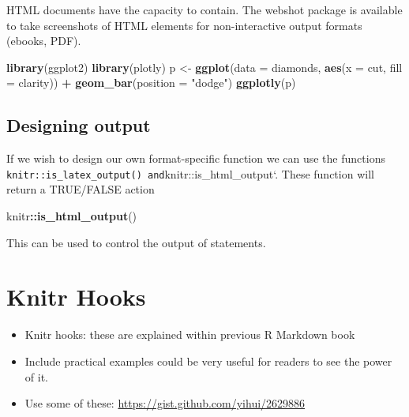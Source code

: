\documentclass[]{book}
\newenvironment{Shaded}{\begin{snugshade}}{\end{snugshade}}
\newcommand{\DataTypeTok}[1]{\textcolor[rgb]{0.13,0.29,0.53}{#1}}
\newcommand{\KeywordTok}[1]{\textcolor[rgb]{0.13,0.29,0.53}{\textbf{#1}}}
\newcommand{\NormalTok}[1]{#1}
\newcommand{\OperatorTok}[1]{\textcolor[rgb]{0.81,0.36,0.00}{\textbf{#1}}}
\newcommand{\StringTok}[1]{\textcolor[rgb]{0.31,0.60,0.02}{#1}}
\providecommand{\tightlist}{%
  \setlength{\itemsep}{0pt}\setlength{\parskip}{0pt}}
\theoremstyle{definition}
\theoremstyle{definition}
\theoremstyle{definition}
\theoremstyle{remark}
\begin{document}
HTML documents have the capacity to contain. The webshot package is
available to take screenshots of HTML elements for non-interactive
output formats (ebooks, PDF).

\begin{Shaded}
\begin{Highlighting}[]
\KeywordTok{library}\NormalTok{(ggplot2)}
\KeywordTok{library}\NormalTok{(plotly)}
\NormalTok{p <-}\StringTok{ }\KeywordTok{ggplot}\NormalTok{(}\DataTypeTok{data =}\NormalTok{ diamonds, }\KeywordTok{aes}\NormalTok{(}\DataTypeTok{x =}\NormalTok{ cut, }\DataTypeTok{fill =}\NormalTok{ clarity)) }\OperatorTok{+}
\StringTok{            }\KeywordTok{geom_bar}\NormalTok{(}\DataTypeTok{position =} \StringTok{"dodge"}\NormalTok{)}
\KeywordTok{ggplotly}\NormalTok{(p)}
\end{Highlighting}
\end{Shaded}

\hypertarget{designing-output}{%
\section{Designing output}\label{designing-output}}

If we wish to design our own format-specific function we can use the
functions
\texttt{knitr::is\_latex\_output()\ and}knitr::is\_html\_output`. These
function will return a TRUE/FALSE action

\begin{Shaded}
\begin{Highlighting}[]
\NormalTok{knitr}\OperatorTok{::}\KeywordTok{is_html_output}\NormalTok{()}
\end{Highlighting}
\end{Shaded}

This can be used to control the output of statements.

\hypertarget{knitr-hooks}{%
\chapter{Knitr Hooks}\label{knitr-hooks}}

\begin{itemize}
\tightlist
\item
  Knitr hooks: these are explained within previous R Markdown book
\item
  Include practical examples could be very useful for readers to see the
  power of it.
\item
  Use some of these: \url{https://gist.github.com/yihui/2629886}
\end{itemize}
\end{document}
